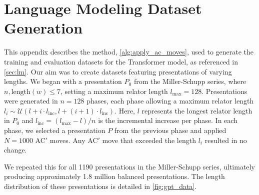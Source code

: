 
\section{Language Modeling Dataset Generation \label{app:algorithm}}

This appendix describes the method, \autoref{alg:apply_ac_moves}, used to generate the training and evaluation datasets for the Transformer model, as referenced in \autoref{sec:lm}. Our aim was to create datasets featuring presentations of varying lengths. We began with a presentation \(P_0\) from the Miller-Schupp series, where \(n, \text{length}(w) \leq 7\), setting a maximum relator length \(l_{\text{max}} = 128\). Presentations were generated in \(n=128\) phases, each phase allowing a maximum relator length \(l_i \sim \mathcal{U}(l + i \cdot l_{\text{inc}}, l + (i+1) \cdot l_{\text{inc}})\). Here, \(l\) represents the longest relator length in \(P_0\) and \(l_{\text{inc}} = (l_{\text{max}} - l)/n\) is the incremental increase per phase. In each phase, we selected a presentation \(P\) from the previous phase and applied \(N=1000\) AC$'$ moves. Any AC$'$ move that exceeded the length \(l_i\) resulted in no change.
\newline 

We repeated this for all 1190 presentations in the Miller-Schupp series, ultimately producing approximately 1.8 million balanced presentations. The length distribution of these presentations is detailed in \autoref{fig:gpt_data}.

